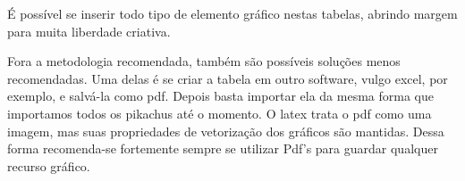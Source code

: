 É possível se inserir todo tipo de elemento gráfico nestas tabelas, abrindo margem para muita liberdade criativa.

Fora a metodologia recomendada, também são possíveis soluções menos recomendadas. Uma delas é se criar a tabela em outro software, vulgo excel, por exemplo, e salvá-la como pdf. Depois basta importar ela da mesma forma que importamos todos os pikachus até o momento. O latex trata o pdf como uma imagem, mas suas propriedades de vetorização dos gráficos são mantidas. 
Dessa forma recomenda-se fortemente sempre se utilizar Pdf's para guardar qualquer recurso gráfico.









